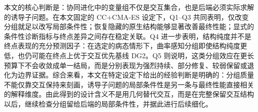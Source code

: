 本文的核心判断是：协同进化中的变量组不仅是交互集合，也是后端必须实际求解的诱导子问题。在本文固定的 CC+CMA-ES 设定下，Q1--Q3 共同表明，仅改变分组就足以改写局部条件性；恢复隐藏的原生结构能够显著改善最终性能；显式的条件性诊断指标与终点差异之间存在稳定关联。Q4 进一步表明，结构纯度并不是终点表现的充分预测因子：在选定的病态情形下，曲率感知分组即使结构纯度更低，也仍可能在终点上优于交互优先基线 DG2。Q5 则说明，这类分组效应在更长预算下不会收敛成单一结局，而是分别表现为强烈持续、部分修复、较弱保留或退化为边界证据。综合来看，本文在特定设定下给出的经验判断是明确的：分组质量不能仅靠交互保持来刻画，诱导子问题的局部条件性是另一条与最终性能直接相关的解释维度。由此得到的设计含义不是用几何替代交互，而是在完整保留交互结构以后，继续检查分组留给后端的局部条件性，并据此进行后续细化。
